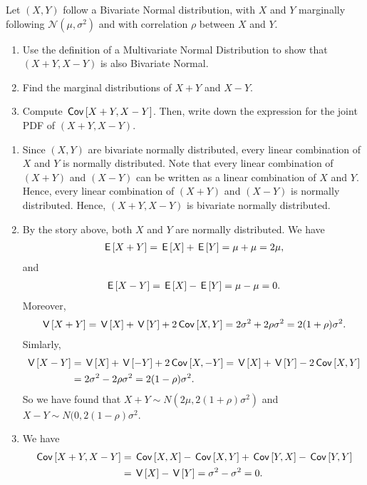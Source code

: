\begin{exercise}
Let $(X,Y)$ follow a Bivariate Normal distribution, with $X$ and $Y$ marginally following $\mathcal{N}(\mu,\sigma^2)$ and with correlation $\rho$ between $X$ and $Y$.
\begin{enumerate}
\item Use the definition of a Multivariate Normal Distribution to show that $(X+Y, X-Y)$ is also Bivariate Normal.
\item Find the marginal distributions of $X+Y$ and $X-Y$.
\item Compute $\,\mathsf{Cov}\left[X+Y,X-Y\right]$. Then, write down the expression for the joint PDF of $(X+Y, X-Y)$.
\end{enumerate}
\begin{solution}
\begin{enumerate}
    \item Since $(X,Y)$ are bivariate normally distributed, every linear combination of $X$ and $Y$ is normally distributed. Note that every linear combination of $(X+Y)$ and $(X-Y)$ can be written as a linear combination of $X$ and $Y$. Hence, every linear combination of $(X+Y)$ and $(X-Y)$ is normally distributed. Hence, $(X+Y, X-Y)$ is bivariate normally distributed.
    \item By the story above, both $X$ and $Y$ are normally distributed. We have
    \begin{align}
        \,\mathsf{E}\left[X+Y\right] = \,\mathsf{E}\left[X\right] + \,\mathsf{E}\left[Y\right] = \mu + \mu = 2\mu,
    \end{align}
    and
    \begin{align}
        \,\mathsf{E}\left[X-Y\right] = \,\mathsf{E}\left[X\right] - \,\mathsf{E}\left[Y\right] = \mu - \mu = 0.
    \end{align}
    Moreover,
    \begin{align}
        \,\mathsf{V}\left[X+Y\right] = \,\mathsf{V}\left[X\right] + \,\mathsf{V}\left[Y\right] + 2\,\mathsf{Cov}\left[X,Y\right] = 2\sigma^2 + 2\rho\sigma^2 = 2(1+\rho)\sigma^2.
    \end{align}
    Simlarly,
    \begin{align}
        \,\mathsf{V}\left[X-Y\right] &= \,\mathsf{V}\left[X\right] + \,\mathsf{V}\left[-Y\right] + 2\,\mathsf{Cov}\left[X,-Y\right] = \,\mathsf{V}\left[X\right] + \,\mathsf{V}\left[Y\right] - 2\,\mathsf{Cov}\left[X,Y\right] \\
&= 2\sigma^2 -2\rho\sigma^2 = 2(1-\rho)\sigma^2.
    \end{align}
    So we have found that $X+Y \sim N(2\mu,2(1+\rho)\sigma^2)$ and $X-Y \sim N(0, 2(1-\rho)\sigma^2$.
    \item We have
    \begin{align}
        \cov{X+Y,X-Y} &= \cov{X,X} - \cov{X,Y} + \cov{Y,X} - \cov{Y,Y} \\
&= \V{X} - \V{Y} = \sigma^2 - \sigma^2 = 0.

\end{align}
\end{enumerate}
\end{solution}
\end{exercise}
